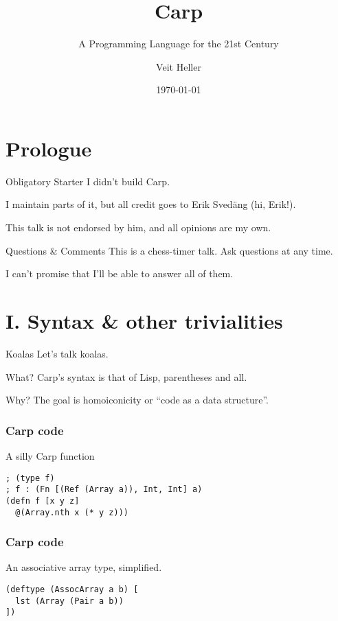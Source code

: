 \documentclass[14pt,aspectratio=169]{beamer}
\title{Carp}
\subtitle{A Programming Language for the 21st Century}
\date{\today}
\author{Veit Heller}
\institute{Port Zero}
\begin{document}
  \maketitle
  \section{Prologue}
  \begin{frame}{Obligatory Starter}
    I didn’t build Carp.
    \linebreak

    I maintain parts of it, but all credit goes to Erik Svedäng (hi, Erik!).
    \linebreak

    This talk is not endorsed by him, and all opinions are my own.
  \end{frame}
  \begin{frame}{Questions \& Comments}
    This is a chess-timer talk. Ask questions at any time.
    \linebreak

    I can’t promise that I’ll be able to answer all of them.
  \end{frame}
  \section{I. Syntax \& other trivialities}
  \begin{frame}{Koalas}
    Let’s talk koalas.
  \end{frame}
  \begin{frame}{What?}
    Carp’s syntax is that of Lisp, parentheses and all.
  \end{frame}
  \begin{frame}{Why?}
    The goal is homoiconicity or “code as a data structure”.
  \end{frame}
  \begin{frame}[fragile]
  \frametitle{Carp code}
    \begin{listing}[H]
      \caption{A silly Carp function}
      \begin{verbatim}
; (type f)
; f : (Fn [(Ref (Array a)), Int, Int] a)
(defn f [x y z]
  @(Array.nth x (* y z)))
      \end{verbatim}
    \end{listing}
  \end{frame}
  \begin{frame}[fragile]
    \frametitle{Carp code}
    \begin{listing}[H]
      \caption{An associative array type, simplified.}
      \begin{verbatim}
(deftype (AssocArray a b) [
  lst (Array (Pair a b))
])
      \end{verbatim}
    \end{listing}
  \end{frame}
\end{document}
